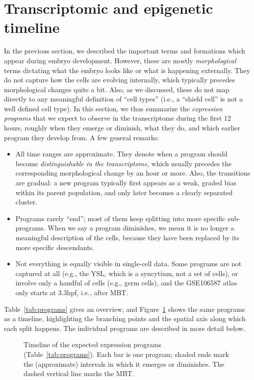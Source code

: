 \documentclass[11pt,a4paper]{article}
\begin{document}
\section{Transcriptomic and epigenetic timeline}

In the previous section, we described the important terms and formations which appear during embryo development. However, these are mostly \emph{morphological} terms dictating what the embryo looks like or what is happening externally. They do not capture how the cells are evolving internally, which typically precedes morphological changes quite a bit. Also, as we discussed, these do not map directly to any meaningful definition of ``cell types'' (i.e., a ``shield cell'' is not a well defined cell type). In this section, we thus summarize the \emph{expression programs} that we expect to observe in the transcriptome during the first 12 hours, roughly when they emerge or diminish, what they do, and which earlier program they develop from. A few general remarks:

\begin{itemize}
	\item All time ranges are approximate. They denote when a program should become \emph{distinguishable in the transcriptome}, which usually precedes the corresponding morphological change by an hour or more. Also, the transitions are gradual: a new program typically first appears as a weak, graded bias within its parent population, and only later becomes a clearly separated cluster.
	\item Programs rarely ``end''; most of them keep splitting into more specific sub-programs. When we say a program diminishes, we mean it is no longer a meaningful description of the cells, because they have been replaced by its more specific descendants.
	\item Not everything is equally visible in single-cell data. Some programs are not captured at all (e.g., the YSL, which is a syncytium, not a set of cells), or involve only a handful of cells (e.g., germ cells), and the GSE106587 atlas only starts at 3.3hpf, i.e., after MBT.
\end{itemize}

Table~\ref{tab:programs} gives an overview, and Figure~\ref{fig:programs} shows the same programs as a timeline, highlighting the branching points and the spatial axis along which each split happens. The individual programs are described in more detail below.

\begin{figure}[p]
	\centering
	
	\caption{Timeline of the expected expression programs (Table~\ref{tab:programs}). Each bar is one program; shaded ends mark the (approximate) intervals in which it emerges or diminishes. The dashed vertical line marks the MBT.}
	\label{fig:programs}
\end{figure}
\end{document}
